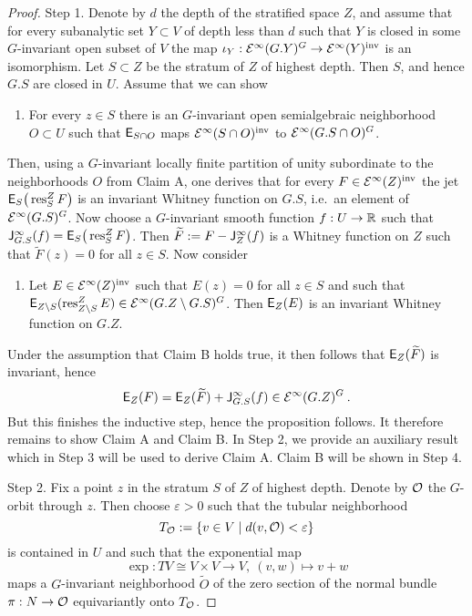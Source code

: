 \begin{proof}
{Step 1.} Denote by  $d$ the depth of the stratified space $Z$, and assume that for 
every subanalytic set $Y\subset V$ of depth less than $d$ such that $Y$ is closed in some $G$-invariant 
open subset of $V$ the map 
$\iota_{Y} : \mathcal{E}^\infty (G.Y)^G \rightarrow \mathcal{E}^\infty (Y)^\textup{inv}$ is an isomorphism. 
Let $S \subset Z$ be the stratum of $Z$ of highest depth. Then $S$, and hence $G.S$ are 
closed in $U$. Assume that we can show
\begin{enumerate}[({Claim} A)]
\item For every $z\in S$ there is an  $G$-invariant open semialgebraic neighborhood $O\subset U$ 
      such that $\mathsf{E}_{S\cap O}$ maps $\mathcal{E}^\infty (S \cap O)^\textup{inv}$ to $\mathcal{E}^\infty (G.S \cap O)^G$.
\end{enumerate}
Then, using a $G$-invariant locally finite partition of unity subordinate to the neighborhoods $O$ 
from Claim A, one derives that for every $F \in \mathcal{E}^\infty (Z)^\textup{inv}$ the jet 
$\mathsf{E}_{S} \big(\operatorname{res}^Z_S F \big)$  is an invariant Whitney function on $G.S$, i.e.~an element of
$\mathcal{E}^\infty (G.S)^G$. Now choose a $G$-invariant smooth function $f: U \rightarrow \mathbb{R}$ such that
$\mathsf{J}^\infty_{G.S} (f) = \mathsf{E}_{S} \big(\operatorname{res}^Z_S F \big)$. Then $\widetilde F := F - \mathsf{J}^\infty_{Z} (f)$ is a Whitney function on 
$Z$ such that $\widetilde F (z) =0$ for all $z\in S$. 
Now consider 
\begin{enumerate}[({Claim} B)]
\item Let $ E \in \mathcal{E}^\infty (Z)^\textup{inv}$ such that $E (z) =0$ for all $z\in S$
  and such that $\mathsf{E}_{Z\setminus S} (\operatorname{res}^Z_{Z\setminus S} E) \in \mathcal{E}^\infty (G. Z\setminus G.S )^G$. 
  Then $\mathsf{E}_Z (E)$ is an invariant Whitney function on $G.Z$. 
\end{enumerate}
Under the assumption that Claim B holds true, it then follows that $\mathsf{E}_Z (\widetilde F)$ is invariant, hence
\[
   \mathsf{E}_Z ( F )  = \mathsf{E}_Z (\widetilde F) + \mathsf{J}^\infty_{G.S} (f)  \in \mathcal{E}^\infty (G.Z)^G \: .
\]
But this finishes the inductive step, hence the proposition follows.  
It therefore remains to show Claim A and Claim B. 
In Step 2, we provide an auxiliary result which in Step 3  will be used to derive Claim A.
Claim B will be shown in Step 4.  



{Step 2.} Fix a point $z$ in the stratum $S$ of $Z$ of highest depth. 
Denote by $\mathcal{O}$ the $G$-orbit through $z$. Then choose $\varepsilon >0 $ such that 
the tubular neighborhood
\[
  T_{\mathcal{O}}:= \{ v \in V \mid d(v,\mathcal{O}) < \varepsilon \} 
\]
is contained in $U$ and such that the exponential map 
\[ \exp:TV \cong V\times V\rightarrow V, \: (v,w) \mapsto v+w \]
maps a $G$-invariant neighborhood $\widetilde O$ of the zero section of the normal bundle 
$\pi : N \rightarrow \mathcal{O}$ equivariantly  onto $T_{\mathcal{O}}$. 
 

\end{proof}
